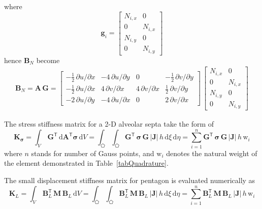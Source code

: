 where 
\begin{equation}
\mathbf{g}_i = \begin{bmatrix}
N_{i,x} &  0 \\
0 & N_{i,x} \\
N_{i,y} & 0 \\
0 & N_{i,y} \end{bmatrix} 
\end{equation}
hence $\mathbf{B}_N$ become
\begin{equation}
\begin{aligned}
\mathbf{B}_{N}  =  \mathbf{A} \, \mathbf{G} = \begin{bmatrix}
-\frac{1}{2} \, \partial u / \partial x &  -4 \, \partial u / \partial y & 0 & -\frac{1}{2} \, \partial v / \partial y \\
-\frac{1}{2} \, \partial u / \partial x &  4 \, \partial v / \partial x & 4 \, \partial v / \partial x & \frac{1}{2} \, \partial v / \partial y \\
-2 \, \partial u / \partial y &  -4 \, \partial u / \partial x & 0 & 2 \, \partial v / \partial x \end{bmatrix}  \, \begin{bmatrix}
N_{i,x} &  0 \\
0 & N_{i,x} \\
N_{i,y} & 0 \\
0 & N_{i,y} \end{bmatrix} 
\end{aligned}
\end{equation}

The stress stiffness matrix for a 2-D alveolar septa take the form of
\begin{equation}
\mathbf{K}_{\boldsymbol{\sigma}} = \int_{V} \, \mathbf{G}^{\mathsf{T}} \, \mathrm{d} \mathbf{A}^{\mathsf{T}} \boldsymbol{\sigma} \, \mathrm{d} V
= \int_{\pentagon} \int_{\pentagon} \mathbf{G}^{\mathsf{T}} \,  \boldsymbol{\sigma} \, \mathbf{G} \, |\mathbf{J}|  \, h \,  \mathrm{d} \xi \,  \mathrm{d} \eta =  \sum_{i=1}^{n}  \mathbf{G}^{\mathsf{T}} \,  \boldsymbol{\sigma} \, \mathbf{G} \, |\mathbf{J}| \, h \, \mathrm{w}_i
\end{equation}
where $n$ stands for number of Gauss points, and $\mathrm{w}_i$ denotes the natural weight of the element demonstrated in Table~\ref{tabQuadrature}.

The small displacement stiffness matrix for pentagon is evaluated numerically as 
\begin{equation}
\mathbf{K}_{L} = \int_{V} \, \mathbf{B}_L^{\mathsf{T}} \, \mathbf{M} \, \mathbf{B}_L \, \mathrm{d} V  = \int_{\pentagon} \int_{\pentagon} \mathbf{B}_L^{\mathsf{T}} \, \mathbf{M} \, \mathbf{B}_L \, |\mathbf{J}| \, h \,  \mathrm{d} \xi \,  \mathrm{d} \eta =  \sum_{i=1}^{n}  \mathbf{B}_L^{\mathsf{T}} \, \mathbf{M} \, \mathbf{B}_L \, |\mathbf{J}|  \, h \, \mathrm{w}_i
\end{equation}

